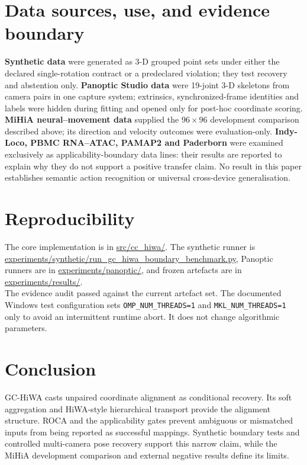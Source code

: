 \documentclass[10pt,a4paper]{article}
\begin{document}
\section{Data sources, use, and evidence boundary}
\textbf{Synthetic data} were generated as 3-D grouped point sets under either the declared single-rotation contract or a predeclared violation; they test recovery and abstention only. \textbf{Panoptic Studio data} were 19-joint 3-D skeletons from camera pairs in one capture system; extrinsics, synchronized-frame identities and labels were hidden during fitting and opened only for post-hoc coordinate scoring. \textbf{MiHiA neural--movement data} supplied the $96\times96$ development comparison described above; its direction and velocity outcomes were evaluation-only. \textbf{Indy-Loco, PBMC RNA--ATAC, PAMAP2 and Paderborn} were examined exclusively as applicability-boundary data lines: their results are reported to explain why they do not support a positive transfer claim. No result in this paper establishes semantic action recognition or universal cross-device generalisation.

\section{Reproducibility}
The core implementation is in \url{src/cc_hiwa/}. The synthetic runner is \url{experiments/synthetic/run_gc_hiwa_boundary_benchmark.py}, Panoptic runners are in \url{experiments/panoptic/}, and frozen artefacts are in \url{experiments/results/}.\\
The evidence audit passed against the current artefact set. The documented Windows test configuration sets \texttt{OMP\_NUM\_THREADS=1} and \texttt{MKL\_NUM\_THREADS=1} only to avoid an intermittent runtime abort. It does not change algorithmic parameters.

\section{Conclusion}
GC-HiWA casts unpaired coordinate alignment as conditional recovery. Its soft aggregation and HiWA-style hierarchical transport provide the alignment structure. ROCA and the applicability gates prevent ambiguous or mismatched inputs from being reported as successful mappings. Synthetic boundary tests and controlled multi-camera pose recovery support this narrow claim, while the MiHiA development comparison and external negative results define its limits.
\appendix
\end{document}
